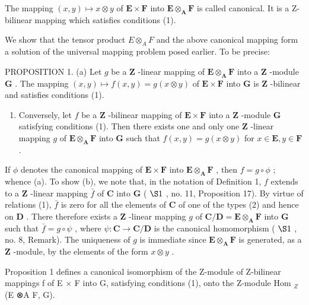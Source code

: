 The mapping \((x,y)\mapsto x\otimes y\) of \(\mathbf{E}\times \mathbf{F}\) into \(\mathbf{E}\otimes_{\mathbf{A}}\mathbf{F}\) is called canonical. It is a Z-bilinear mapping which satisfies conditions (1).

We show that the tensor product \(E \otimes_{A} F\) and the above canonical mapping form a solution of the universal mapping problem posed earlier. To be precise:

PROPOSITION 1. (a) Let \(g\) be a \(\mathbf{Z}\) -linear mapping of \(\mathbf{E} \otimes_{\mathbf{A}} \mathbf{F}\) into a \(\mathbf{Z}\) -module \(\mathbf{G}\) . The mapping \((x, y) \mapsto f(x, y) = g(x \otimes y)\) of \(\mathbf{E} \times \mathbf{F}\) into \(\mathbf{G}\) is \(\mathbf{Z}\) -bilinear and satisfies conditions (1).

\begin{enumerate}
\def\labelenumi{(\alph{enumi})}
\setcounter{enumi}{1}
\tightlist
\item
  Conversely, let \(f\) be a \(\mathbf{Z}\) -bilinear mapping of \(\mathbf{E} \times \mathbf{F}\) into a \(\mathbf{Z}\) -module \(\mathbf{G}\) satisfying conditions (1). Then there exists one and only one \(\mathbf{Z}\) -linear mapping \(g\) of \(\mathbf{E} \otimes_{\mathbf{A}} \mathbf{F}\) into \(\mathbf{G}\) such that \(f(x,y) = g(x \otimes y)\) for \(x \in \mathbf{E}, y \in \mathbf{F}\) .
\end{enumerate}

If \(\phi\) denotes the canonical mapping of \(\mathbf{E} \times \mathbf{F}\) into \(\mathbf{E} \otimes_{\mathbf{A}} \mathbf{F}\) , then \(f = g \circ \phi\) ; whence (a). To show (b), we note that, in the notation of Definition 1, \(f\) extends to a \(\mathbf{Z}\) -linear mapping \(\bar{f}\) of \(\mathbf{C}\) into \(\mathbf{G}\) ( \(\S 1\) , no. 11, Proposition 17). By virtue of relations (1), \(\bar{f}\) is zero for all the elements of \(\mathbf{C}\) of one of the types (2) and hence on \(\mathbf{D}\) . There therefore exists a \(\mathbf{Z}\) -linear mapping \(g\) of \(\mathbf{C} / \mathbf{D} = \mathbf{E} \otimes_{\mathbf{A}} \mathbf{F}\) into \(\mathbf{G}\) such that \(\bar{f} = g \circ \psi\) , where \(\psi: \mathbf{C} \to \mathbf{C} / \mathbf{D}\) is the canonical homomorphism ( \(\S 1\) , no. 8, Remark). The uniqueness of \(g\) is immediate since \(\mathbf{E} \otimes_{\mathbf{A}} \mathbf{F}\) is generated, as a \(\mathbf{Z}\) -module, by the elements of the form \(x \otimes y\) .

Proposition 1 defines a canonical isomorphism of the Z-module of Z-bilinear mappings f of E × F into G, satisfying conditions (1), onto the Z-module Hom \(_{Z}\) (E ⊗A F, G).

